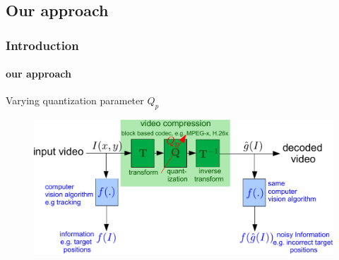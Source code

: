 \subsection{Our approach}
\begin{frame}
\frametitle{Introduction}
\framesubtitle{our approach} 
\logoCSIPCPL\mypagenum
	{\color{red}Varying quantization parameter $Q_p$}
	\begin{figure}
		\includegraphics[width=1.0\textwidth]{figs/TRK_IPCV2009_BlockDiagram_2_VarPar_2.pdf}
	\end{figure}
\end{frame}



